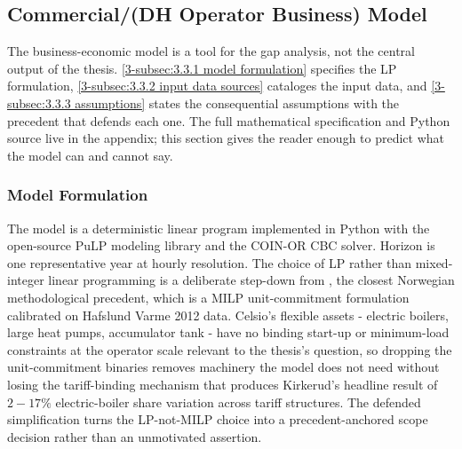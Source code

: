 

\subsection{Commercial/(DH Operator Business) Model}
\label{3-subsec:3.3 DH operator model}

The business-economic model is a tool for the gap analysis, not the central output of the thesis. \autoref{3-subsec:3.3.1 model formulation} specifies the LP formulation, \autoref{3-subsec:3.3.2 input data sources} cataloges the input data, and \autoref{3-subsec:3.3.3 assumptions} states the consequential assumptions with the precedent that defends each one. The full mathematical specification and Python source live in the appendix; this section gives the reader enough to predict what the model can and cannot say.


\subsubsection{Model Formulation}
\label{3-subsec:3.3.1 model formulation}

The model is a deterministic linear program implemented in Python with the open-source PuLP modeling library and the COIN-OR CBC solver. Horizon is one representative year at hourly resolution. The choice of LP rather than mixed-integer linear programming is a deliberate step-down from \cite{kirkerud_impacts_2016}, the closest Norwegian methodological precedent, which is a MILP unit-commitment formulation calibrated on Hafslund Varme 2012 data. Celsio's flexible assets - electric boilers, large heat pumps, accumulator tank - have no binding start-up or minimum-load constraints at the operator scale relevant to the thesis's question, so dropping the unit-commitment binaries removes machinery the model does not need without losing the tariff-binding mechanism that produces Kirkerud's headline result of $2-17\%$ electric-boiler share variation across tariff structures. The defended simplification turns the LP-not-MILP choice into a precedent-anchored scope decision rather than an unmotivated assertion.

